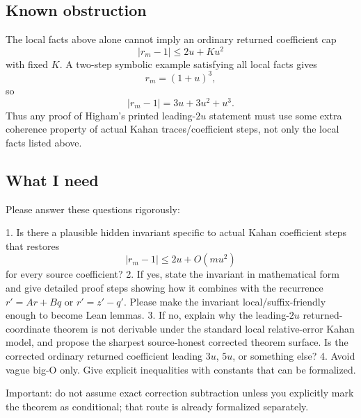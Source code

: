 \documentclass{article}
\begin{document}
\subsection*{Known obstruction}

The local facts above alone cannot imply an ordinary returned coefficient cap
\[
  |r_m-1|\le 2u+K u^2
\]
with fixed \(K\).  A two-step symbolic example satisfying all local facts gives
\[
  r_m=(1+u)^3,
\]
so
\[
  |r_m-1|=3u+3u^2+u^3.
\]
Thus any proof of Higham's printed leading-\(2u\) statement must use some extra
coherence property of actual Kahan traces/coefficient steps, not only the local
facts listed above.

\subsection*{What I need}

Please answer these questions rigorously:

1. Is there a plausible hidden invariant specific to actual Kahan coefficient
   steps that restores
   \[
     |r_m-1|\le 2u+O(m u^2)
   \]
   for every source coefficient?
2. If yes, state the invariant in mathematical form and give detailed proof
   steps showing how it combines with the recurrence \(r'=A r+Bq\) or
   \(r'=z'-q'\).  Please make the invariant local/suffix-friendly enough to
   become Lean lemmas.
3. If no, explain why the leading-\(2u\) returned-coordinate theorem is not
   derivable under the standard local relative-error Kahan model, and propose
   the sharpest source-honest corrected theorem surface.  Is the corrected
   ordinary returned coefficient leading \(3u\), \(5u\), or something else?
4. Avoid vague big-O only.  Give explicit inequalities with constants that can
   be formalized.

Important: do not assume exact correction subtraction unless you explicitly
mark the theorem as conditional; that route is already formalized separately.
\end{document}
